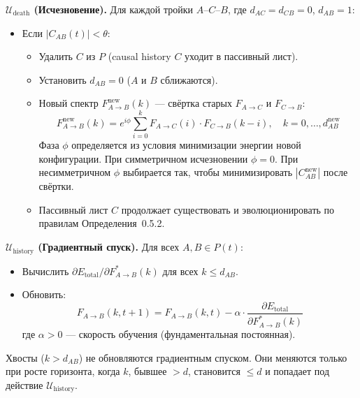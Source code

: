 \documentclass[12pt,a4paper]{article}
\begin{document}
\textbf{$\mathcal{U}_{\text{death}}$ (Исчезновение).}
Для каждой тройки $A$--$C$--$B$, где $d_{AC} = d_{CB} = 0$, $d_{AB} = 1$:
\begin{itemize}
    \item Если $|C_{AB}(t)| < \theta$:
    \begin{itemize}
        \item Удалить $C$ из $P$ (causal history $C$ уходит в пассивный лист).
        \item Установить $d_{AB} = 0$ ($A$ и $B$ сближаются).
        \item Новый спектр $F_{A \to B}^{\text{new}}(k)$ --- свёртка старых $F_{A \to C}$ и $F_{C \to B}$:
        \begin{equation}
            F_{A \to B}^{\text{new}}(k) = e^{i\phi} \sum_{i=0}^{k} F_{A \to C}(i) \cdot F_{C \to B}(k-i), \quad k = 0, \dots, d_{AB}^{\text{new}}
        \end{equation}
        Фаза $\phi$ определяется из условия минимизации энергии новой конфигурации. При симметричном исчезновении $\phi = 0$. При несимметричном $\phi$ выбирается так, чтобы минимизировать $|C_{AB}^{\text{new}}|$ после свёртки.
        \item Пассивный лист $C$ продолжает существовать и эволюционировать по правилам Определения~0.5.2.
    \end{itemize}
\end{itemize}

\textbf{$\mathcal{U}_{\text{history}}$ (Градиентный спуск).}
Для всех $A, B \in P(t)$:
\begin{itemize}
    \item Вычислить $\partial E_{\text{total}} / \partial F_{A \to B}^*(k)$ для всех $k \leq d_{AB}$.
    \item Обновить:
    \begin{equation}
        F_{A \to B}(k, t+1) = F_{A \to B}(k, t) - \alpha \cdot \frac{\partial E_{\text{total}}}{\partial F_{A \to B}^*(k)}
    \end{equation}
    где $\alpha > 0$ --- скорость обучения (фундаментальная постоянная).
\end{itemize}

Хвосты ($k > d_{AB}$) не обновляются градиентным спуском. Они меняются только при росте горизонта, когда $k$, бывшее $> d$, становится $\leq d$ и попадает под действие $\mathcal{U}_{\text{history}}$.
\end{document}
